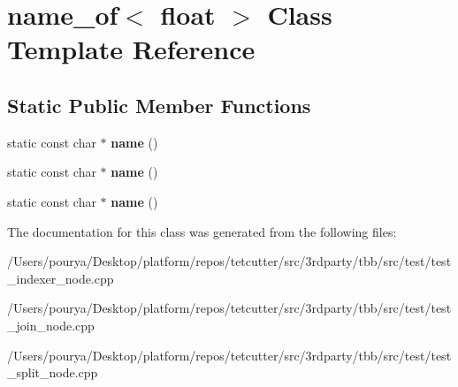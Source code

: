 \hypertarget{classname__of_3_01float_01_4}{}\section{name\+\_\+of$<$ float $>$ Class Template Reference}
\label{classname__of_3_01float_01_4}
\subsection*{Static Public Member Functions}
\begin{DoxyCompactItemize}
\item 
\hypertarget{classname__of_3_01float_01_4_a3b37767547a1fa78647a0bd710fc99e3}{}static const char $\ast$ {\bfseries name} ()\label{classname__of_3_01float_01_4_a3b37767547a1fa78647a0bd710fc99e3}

\item 
\hypertarget{classname__of_3_01float_01_4_a3b37767547a1fa78647a0bd710fc99e3}{}static const char $\ast$ {\bfseries name} ()\label{classname__of_3_01float_01_4_a3b37767547a1fa78647a0bd710fc99e3}

\item 
\hypertarget{classname__of_3_01float_01_4_a3b37767547a1fa78647a0bd710fc99e3}{}static const char $\ast$ {\bfseries name} ()\label{classname__of_3_01float_01_4_a3b37767547a1fa78647a0bd710fc99e3}

\end{DoxyCompactItemize}


The documentation for this class was generated from the following files\+:\begin{DoxyCompactItemize}
\item 
/\+Users/pourya/\+Desktop/platform/repos/tetcutter/src/3rdparty/tbb/src/test/test\+\_\+indexer\+\_\+node.\+cpp\item 
/\+Users/pourya/\+Desktop/platform/repos/tetcutter/src/3rdparty/tbb/src/test/test\+\_\+join\+\_\+node.\+cpp\item 
/\+Users/pourya/\+Desktop/platform/repos/tetcutter/src/3rdparty/tbb/src/test/test\+\_\+split\+\_\+node.\+cpp\end{DoxyCompactItemize}
